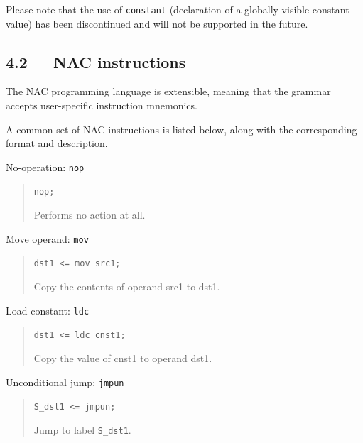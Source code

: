 \documentclass[a4paper]{article}
\begin{document}
Please note that the use of \texttt{constant} (declaration of a globally-visible
constant value) has been discontinued and will not be supported in the
future.


\subsection{4.2~~~NAC instructions%
  \label{nac-instructions}%
}

The NAC programming language is extensible, meaning that the grammar accepts
user-specific instruction mnemonics.

A common set of NAC instructions is listed below, along with the corresponding
format and description.

No-operation: \texttt{nop}
%
\begin{quote}

\texttt{nop;}

Performs no action at all.

\end{quote}

Move operand: \texttt{mov}
%
\begin{quote}

\texttt{dst1 <= mov src1;}

Copy the contents of operand src1 to dst1.

\end{quote}

Load constant: \texttt{ldc}
%
\begin{quote}

\texttt{dst1 <= ldc cnst1;}

Copy the value of cnst1 to operand dst1.

\end{quote}

Unconditional jump: \texttt{jmpun}
%
\begin{quote}

\texttt{S\_dst1 <= jmpun;}

Jump to label \texttt{S\_dst1}.

\end{quote}
\end{document}
